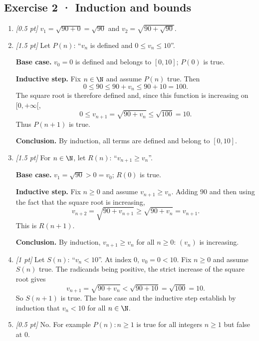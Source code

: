 \subsection*{Exercise 2 · Induction and bounds}\begin{enumerate}

\item \textit{[0.5 pt]} $v_1=\sqrt{90+0}=\sqrt{90}$ and $v_2=\sqrt{90+\sqrt{90}}$.

\item \textit{[1.5 pt]} Let $P(n)$: ``$v_n$ is defined and $0\le v_n\le 10$''.
\par\smallskip\textbf{Base case.} $v_0=0$ is defined and belongs to $[0,10]$; $P(0)$ is true.
\par\smallskip\textbf{Inductive step.} Fix $n\in\N$ and assume $P(n)$ true. Then
\[0\le 90\le 90+v_n\le 90+10=100.\]
The square root is therefore defined and, since this function is increasing on $[0,+\infty[$,
\[0\le v_{n+1}=\sqrt{90+v_n}\le\sqrt{100}=10.\]
Thus $P(n+1)$ is true.
\par\smallskip\textbf{Conclusion.} By induction, all terms are defined and belong to $[0,10]$.

\item \textit{[1.5 pt]} For $n\in\N$, let $R(n)$: ``$v_{n+1}\ge v_n$''.
\par\smallskip\textbf{Base case.} $v_1=\sqrt{90}>0=v_0$; $R(0)$ is true.
\par\smallskip\textbf{Inductive step.} Fix $n\ge0$ and assume $v_{n+1}\ge v_n$. Adding $90$ and then using the fact that the square root is increasing,
\[v_{n+2}=\sqrt{90+v_{n+1}}\ge\sqrt{90+v_n}=v_{n+1}.\]
This is $R(n+1)$.
\par\smallskip\textbf{Conclusion.} By induction, $v_{n+1}\ge v_n$ for all $n\ge0$: $(v_n)$ is increasing.

\item \textit{[1 pt]} Let $S(n)$: ``$v_n<10$''. At index $0$, $v_0=0<10$.
Fix $n\ge0$ and assume $S(n)$ true. The radicands being positive, the strict increase of the square root gives
\[v_{n+1}=\sqrt{90+v_n}<\sqrt{90+10}=\sqrt{100}=10.\]
So $S(n+1)$ is true. The base case and the inductive step establish by induction that $v_n<10$ for all $n\in\N$.

\item \textit{[0.5 pt]} No. For example $P(n):n\ge1$ is true for all integers $n\ge1$ but false at $0$.

\end{enumerate}

